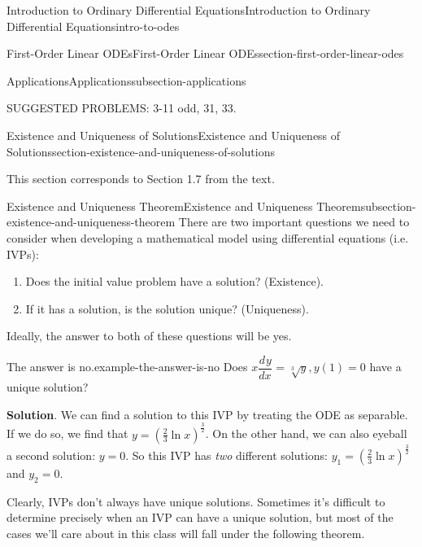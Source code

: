 \documentclass[oneside,10pt,]{book}
\numberwithin{equation}{section}
\newcommand{\dv}[3][]{\dfrac{d^{#1} #2}{d #3^{#1}}}
\begin{document}
\begin{chapterptx}{Introduction to Ordinary Differential Equations}{}{Introduction to Ordinary Differential Equations}{}{}{intro-to-odes}
\begin{sectionptx}{First-Order Linear ODEs}{}{First-Order Linear ODEs}{}{}{section-first-order-linear-odes}
\begin{subsectionptx}{Applications}{}{Applications}{}{}{subsection-applications}
\end{subsectionptx}
\begin{conclusion}{}%
\hypertarget{p-90}{}%
SUGGESTED PROBLEMS: 3-11 odd, 31, 33.%
\end{conclusion}%
\end{sectionptx}
%
%
\typeout{************************************************}
\typeout{************************************************}
%
\begin{sectionptx}{Existence and Uniqueness of Solutions}{}{Existence and Uniqueness of Solutions}{}{}{section-existence-and-uniqueness-of-solutions}
\begin{introduction}{}%
\hypertarget{p-91}{}%
This section corresponds to Section 1.7 from the text.%
\end{introduction}%
%
%
\typeout{************************************************}
\typeout{************************************************}
%
\begin{subsectionptx}{Existence and Uniqueness Theorem}{}{Existence and Uniqueness Theorem}{}{}{subsection-existence-and-uniqueness-theorem}
\hypertarget{p-92}{}%
There are two important questions we need to consider when developing a mathematical model using differential equations (i.e. IVPs):\leavevmode%
\begin{enumerate}
\item\hypertarget{li-9}{}Does the initial value problem have a solution? (Existence).%
\item\hypertarget{li-10}{}If it has a solution, is the solution unique? (Uniqueness).%
\end{enumerate}
Ideally, the answer to both of these questions will be yes.%
\begin{example}{The answer is no.}{example-the-answer-is-no}%
\hypertarget{p-93}{}%
Does \(x\dv{y}{x} = \sqrt[3]{y},y(1) = 0\) have a unique solution?%
\par\smallskip%
\noindent\textbf{Solution}.\hypertarget{solution-16}{}\quad%
\hypertarget{p-94}{}%
We can find a solution to this IVP by treating the ODE as separable. If we do so, we find that \(y = \left(\frac{2}{3}\ln x\right)^{\frac{3}{2}}\). On the other hand, we can also eyeball a second solution: \(y=0\). So this IVP has \emph{two} different solutions: \(y_{1} = \left(\frac{2}{3}\ln x\right)^{\frac{3}{2}}\) and \(y_{2} = 0\).%
\end{example}
\hypertarget{p-95}{}%
Clearly, IVPs don't always have unique solutions. Sometimes it's difficult to determine precisely when an IVP can have a unique solution, but most of the cases we'll care about in this class will fall under the following theorem.%

\end{subsectionptx}
\end{sectionptx}
\end{chapterptx}
\end{document}

